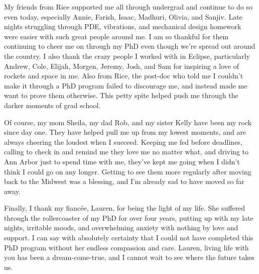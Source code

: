 My friends from Rice supported me all through undergrad and continue to do so even today, especially Annie, Farish, Isaac, Madhuri, Olivia, and Sanjiv. Late nights struggling through PDE, vibrations, and mechanical design homework were easier with such great people around me. I am so thankful for them continuing to cheer me on through my PhD even though we're spread out around the country. I also thank the crazy people I worked with in Eclipse, particularly Andrew, Cole, Elijah, Morgen, Jeremy, Josh, and Sam for inspiring a love of rockets and space in me. Also from Rice, the post-doc who told me I couldn't make it through a PhD program failed to discourage me, and instead made me want to prove them otherwise. This petty spite helped push me through the darker moments of grad school.

Of course, my mom Sheila, my dad Rob, and my sister Kelly have been my rock since day one. They have helped pull me up from my lowest moments, and are always cheering the loudest when I succeed. Keeping me fed before deadlines, calling to check in and remind me they love me no matter what, and driving to Ann Arbor just to spend time with me, they've kept me going when I didn't think I could go on any longer. Getting to see them more regularly after moving back to the Midwest was a blessing, and I'm already sad to have moved so far away. 

Finally, I thank my fianc\'{e}e, Lauren, for being the light of my life. She suffered through the rollercoaster of my PhD for over four years, putting up with my late nights, irritable moods, and overwhelming anxiety with nothing by love and support. I can say with absolutely certainty that I could not have completed this PhD program without her endless compassion and care. Lauren, living life with you has been a dream-come-true, and I cannot wait to see where the future takes us.
